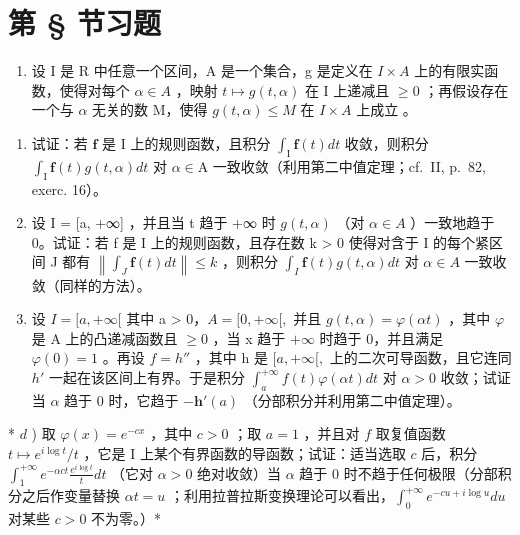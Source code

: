 \setcounter{exercisegroup}{2}
\section*{第 \S{} 节习题}
{}

\begin{enumerate}
\def\labelenumi{\arabic{enumi})}
\tightlist
\item
  设 I 是 R 中任意一个区间，A 是一个集合，g 是定义在 \(I \times A\) 上的有限实函数，使得对每个 \(\alpha \in A\) ，映射 \(t \mapsto g(t, \alpha)\) 在 I 上递减且 \(\geqslant 0\) ；再假设存在一个与 \(\alpha\) 无关的数 M，使得 \(g(t, \alpha) \leqslant M\) 在 \(I \times A\) 上成立 。
\end{enumerate}

\begin{enumerate}
\def\labelenumi{\alph{enumi})}
\item
  试证：若 \(\mathbf{f}\) 是 I 上的规则函数，且积分 \(\int_{\mathrm{I}} \mathbf{f}(t) dt\) 收敛，则积分 \(\int_{\mathrm{I}} \mathbf{f}(t) g(t, \alpha) dt\) 对 \(\alpha \in \mathrm{A}\) 一致收敛（利用第二中值定理；cf.~II, p.~82, exerc. 16）。
\item
  设 I = {[}a, +∞{]} ，并且当 t 趋于 +∞ 时 \(g(t, \alpha)\) （对 \(\alpha \in A\) ）一致地趋于 0。试证：若 f 是 I 上的规则函数，且存在数 k \textgreater{} 0 使得对含于 I 的每个紧区间 J 都有 \(\left\|\int_{J} \mathbf{f}(t) dt\right\| \leqslant k\) ，则积分 \(\int_{I} \mathbf{f}(t) g(t, \alpha) dt\) 对 \(\alpha \in A\) 一致收敛（同样的方法）。
\item
  设 \(I = [a, +\infty[\) 其中 a \textgreater{} 0，\(A = [0, +\infty[,\) 并且 \(g(t, \alpha) = \varphi(\alpha t)\) ，其中 \(\varphi\) 是 A 上的凸递减函数且 \(\geqslant 0\) ，当 x 趋于 \(+\infty\) 时趋于 0，并且满足 \(\varphi(0) = 1\) 。再设 \(f = h''\) ，其中 h 是 \([a, +\infty[,\) 上的二次可导函数，且它连同 \(h'\) 一起在该区间上有界。于是积分 \(\int_{a}^{+\infty} f(t) \varphi(\alpha t) dt\) 对 \(\alpha > 0\) 收敛；试证当 \(\alpha\) 趋于 0 时，它趋于 \(-\mathbf{h}'(a)\) （分部积分并利用第二中值定理）。
\end{enumerate}

* \(d\) ) 取 \(\varphi (x) = e^{-cx}\) ，其中 \(c > 0\) ；取 \(a = 1\) ，并且对 \(f\) 取复值函数 \(t\mapsto e^{i\log t} / t\) ，它是 I 上某个有界函数的导函数；试证：适当选取 \(c\) 后，积分 \(\int_{1}^{+\infty}e^{-\alpha ct}\frac{e^{i\log t}}{t} dt\) （它对 \(\alpha >0\) 绝对收敛）当 \(\alpha\) 趋于 0 时不趋于任何极限（分部积分之后作变量替换 \(\alpha t = u\) ；利用拉普拉斯变换理论可以看出，\(\int_0^{+\infty}e^{-cu + i\log u}du\) 对某些 \(c > 0\) 不为零。）*


